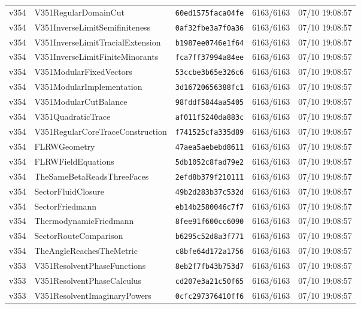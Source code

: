 \documentclass[11pt]{article}
\theoremstyle{definition}\newtheorem{deriv}{Derivation}
\begin{document}
{\begin{longtable}{@{}lllll@{}}
v354 & V351RegularDomainCut & \texttt{60ed1575faca04fe} & 6163/6163 & 07/10 19:08:57 \\
v354 & V351InverseLimitSemifiniteness & \texttt{0af32fbe3a7f0a36} & 6163/6163 & 07/10 19:08:57 \\
v354 & V351InverseLimitTracialExtension & \texttt{b1987ee0746e1f64} & 6163/6163 & 07/10 19:08:57 \\
v354 & V351InverseLimitFiniteMinorants & \texttt{fca7ff37994a84ee} & 6163/6163 & 07/10 19:08:57 \\
v354 & V351ModularFixedVectors & \texttt{53ccbe3b65e326c6} & 6163/6163 & 07/10 19:08:57 \\
v354 & V351ModularImplementation & \texttt{3d16720656388fc1} & 6163/6163 & 07/10 19:08:57 \\
v354 & V351ModularCutBalance & \texttt{98fddf5844aa5405} & 6163/6163 & 07/10 19:08:57 \\
v354 & V351QuadraticTrace & \texttt{af011f5240da883c} & 6163/6163 & 07/10 19:08:57 \\
v354 & V351RegularCoreTraceConstruction & \texttt{f741525cfa335d89} & 6163/6163 & 07/10 19:08:57 \\
v354 & FLRWGeometry & \texttt{47aea5aebebd8611} & 6163/6163 & 07/10 19:08:57 \\
v354 & FLRWFieldEquations & \texttt{5db1052c8fad79e2} & 6163/6163 & 07/10 19:08:57 \\
v354 & TheSameBetaReadsThreeFaces & \texttt{2efd8b379f210111} & 6163/6163 & 07/10 19:08:57 \\
v354 & SectorFluidClosure & \texttt{49b2d283b37c532d} & 6163/6163 & 07/10 19:08:57 \\
v354 & SectorFriedmann & \texttt{eb14b2580046c7f7} & 6163/6163 & 07/10 19:08:57 \\
v354 & ThermodynamicFriedmann & \texttt{8fee91f600cc6090} & 6163/6163 & 07/10 19:08:57 \\
v354 & SectorRouteComparison & \texttt{b6295c52d8a3f771} & 6163/6163 & 07/10 19:08:57 \\
v354 & TheAngleReachesTheMetric & \texttt{c8bfe64d172a1756} & 6163/6163 & 07/10 19:08:57 \\
v353 & V351ResolventPhaseFunctions & \texttt{8eb2f7fb43b753d7} & 6163/6163 & 07/10 19:08:57 \\
v353 & V351ResolventPhaseCalculus & \texttt{cd207e3a21c50f65} & 6163/6163 & 07/10 19:08:57 \\
v353 & V351ResolventImaginaryPowers & \texttt{0cfc297376410ff6} & 6163/6163 & 07/10 19:08:57 \\

\end{longtable}}
\end{document}
